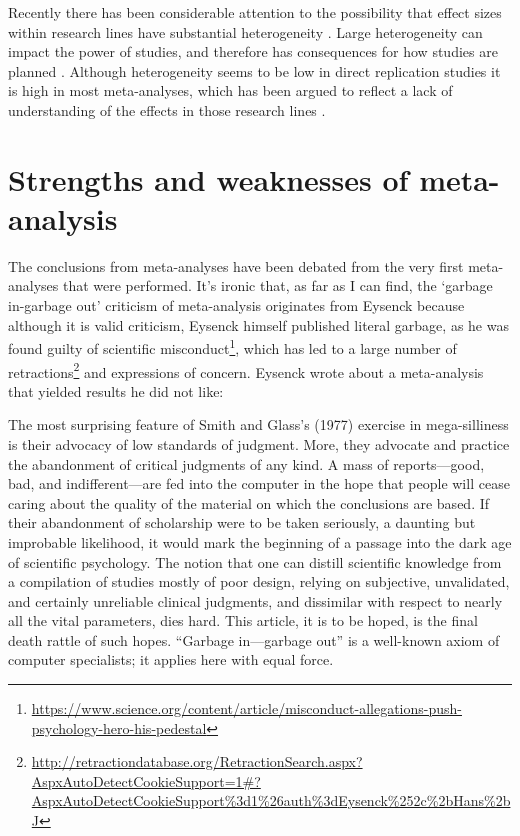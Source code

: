 \documentclass[
  oneside]{krantz}
\renewenvironment{quote}{\begin{VF}}{\end{VF}}
\renewcommand{\href}[2]{#2\footnote{\url{#1}}}
\begin{document}
Recently there has been considerable attention to the possibility that effect sizes within research lines have substantial heterogeneity \citep{bryan_behavioural_2021}. Large heterogeneity can impact the power of studies, and therefore has consequences for how studies are planned \citep{kenny_unappreciated_2019}. Although heterogeneity seems to be low in direct replication studies \citep{olsson-collentine_heterogeneity_2020} it is high in most meta-analyses, which has been argued to reflect a lack of understanding of the effects in those research lines \citep{linden_heterogeneity_2021}.

\hypertarget{strengths-and-weaknesses-of-meta-analysis}{%
\section{Strengths and weaknesses of meta-analysis}\label{strengths-and-weaknesses-of-meta-analysis}}

The conclusions from meta-analyses have been debated from the very first meta-analyses that were performed. It's ironic that, as far as I can find, the `garbage in-garbage out' criticism of meta-analysis originates from Eysenck \citeyearpar{eysenck_exercise_1978} because although it is valid criticism, Eysenck himself published literal garbage, as he was found \href{https://www.science.org/content/article/misconduct-allegations-push-psychology-hero-his-pedestal}{guilty of scientific misconduct}, which has led to a large number of \href{http://retractiondatabase.org/RetractionSearch.aspx?AspxAutoDetectCookieSupport=1\#?AspxAutoDetectCookieSupport\%3d1\%26auth\%3dEysenck\%252c\%2bHans\%2bJ}{retractions} and expressions of concern. Eysenck wrote about a meta-analysis that yielded results he did not like:

\begin{quote}
The most surprising feature of Smith and Glass's (1977) exercise in mega-silliness is their advocacy of low standards of judgment. More, they advocate and practice the abandonment of critical judgments of any kind. A mass of reports---good, bad, and indifferent---are fed into the
computer in the hope that people will cease caring about the quality of the material on which the conclusions are based. If their abandonment of scholarship were to be taken seriously, a daunting but improbable likelihood, it would mark the beginning of a passage into the dark age of scientific psychology.
The notion that one can distill scientific knowledge from a compilation of studies mostly of poor design, relying on subjective, unvalidated, and certainly unreliable clinical judgments, and dissimilar with respect to nearly all the vital parameters, dies hard. This article, it is to be hoped, is the final death rattle of such hopes. ``Garbage in---garbage out'' is a well-known axiom of computer specialists; it applies here with equal force.
\end{quote}
\end{document}
